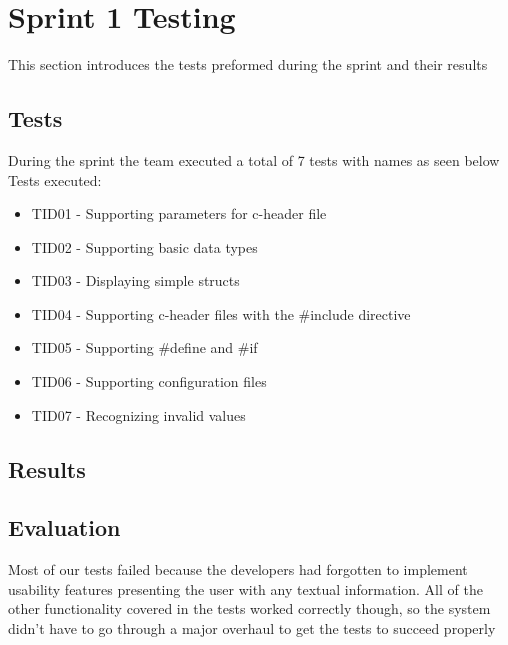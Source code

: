 \section{Sprint 1 Testing}
This section introduces the tests preformed during the sprint and their results

\subsection{Tests}
During the sprint the team executed a total of 7 tests with names as seen below\\

\noindent Tests executed:

\begin{itemize}
\item TID01 - Supporting parameters for c-header file 
\item TID02 - Supporting basic data types
\item TID03 -  Displaying simple structs 
\item TID04 - Supporting c-header files with the #include directive
\item TID05 - Supporting #define and #if
\item TID06 - Supporting configuration files
\item TID07 - Recognizing invalid values
\end{itemize}

\subsection{Results}



\subsection{Evaluation}
Most of our tests failed because the developers had forgotten to implement usability features presenting the user with any textual information. All of the other functionality covered in the tests worked correctly though, so the system didn't have to go through a major overhaul to get the tests to succeed properly